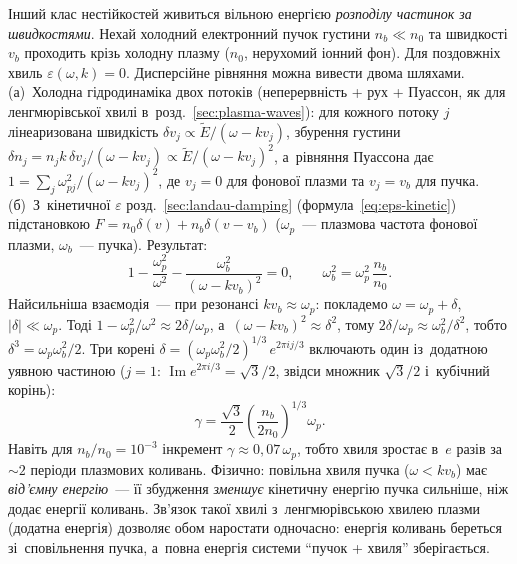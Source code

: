 Інший клас нестійкостей живиться вільною енергією \emph{розподілу частинок за швидкостями}.
Нехай холодний електронний пучок густини $n_b\ll n_0$ та швидкості $v_b$ проходить крізь холодну
плазму ($n_0$, нерухомий іонний фон). Для поздовжніх хвиль
$\varepsilon(\omega,k)=0$. Дисперсійне рівняння можна вивести двома шляхами. (а)~Холодна гідродинаміка двох потоків
(неперервність + рух + Пуассон, як для ленгмюрівської хвилі в~розд.~\ref{sec:plasma-waves}): для кожного потоку $j$ лінеаризована швидкість $\delta v_j\propto\widetilde E/(\omega-kv_j)$,
збурення густини $\delta n_j=n_jk\,\delta v_j/(\omega-kv_j)\propto\widetilde E/(\omega-kv_j)^2$, а~рівняння Пуассона
дає $1=\sum_j\omega_{pj}^2/(\omega-kv_j)^2$, де $v_j=0$ для фонової плазми та $v_j=v_b$ для пучка.
(б)~З~кінетичної $\varepsilon$ розд.~\ref{sec:landau-damping} (формула~\eqref{eq:eps-kinetic}) підстановкою
$F=n_0\delta(v)+n_b\delta(v-v_b)$ ($\omega_p$~--- плазмова частота фонової плазми, $\omega_b$~--- пучка). Результат:
\begin{equation}\label{eq:beam-dispersion}
	1-\frac{\omega_p^2}{\omega^2}-\frac{\omega_b^2}{(\omega-kv_b)^2}=0,\qquad
	\omega_b^2=\omega_p^2\,\frac{n_b}{n_0}.
\end{equation}
Найсильніша взаємодія~--- при резонансі $kv_b\approx\omega_p$: покладемо $\omega=\omega_p+\delta$, $|\delta|\ll\omega_p$.
Тоді $1-\omega_p^2/\omega^2\approx2\delta/\omega_p$, а~$(\omega-kv_b)^2\approx\delta^2$, тому
$2\delta/\omega_p\approx\omega_b^2/\delta^2$, тобто $\delta^3=\omega_p\omega_b^2/2$. Три корені
$\delta=(\omega_p\omega_b^2/2)^{1/3}\,e^{2\pi ij/3}$ включають один із~додатною уявною частиною ($j=1$: $\operatorname{Im}e^{2\pi i/3}=\sqrt3/2$, звідси множник $\sqrt3/2$ і~кубічний корінь):
\begin{equation}\label{eq:beam-growth}
	\gamma=\frac{\sqrt3}2\left(\frac{n_b}{2n_0}\right)^{1/3}\omega_p.
\end{equation}
Навіть для $n_b/n_0=10^{-3}$ інкремент $\gamma\approx0{,}07\,\omega_p$, тобто хвиля зростає
в~$e$ разів за $\sim2$ періоди плазмових коливань. Фізично: повільна хвиля пучка ($\omega<kv_b$) має
\emph{від'ємну енергію}~--- її збудження \emph{зменшує} кінетичну енергію пучка сильніше, ніж додає
енергії коливань. Зв'язок такої хвилі з~ленгмюрівською хвилею плазми (додатна енергія) дозволяє обом
наростати одночасно: енергія коливань береться зі~сповільнення пучка, а~повна енергія системи
\enquote{пучок + хвиля} зберігається.

